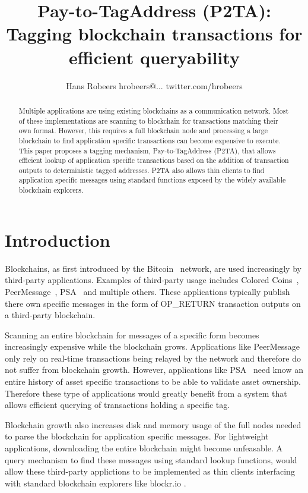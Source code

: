 \documentclass[a4paper,10pt]{article}
\title{Pay-to-TagAddress (P2TA): Tagging blockchain transactions for efficient queryability}
\author{Hans Robeers hrobeers@... twitter.com/hrobeers}
\begin{document}
\maketitle

\begin{abstract}
Multiple applications are using existing blockchains as a communication network.
Most of these implementations are scanning to blockchain for transactions matching their own format.
However, this requires a full blockchain node and processing a large blockchain to find application specific transactions can become expensive to execute.
This paper proposes a tagging mechanism, Pay-to-TagAddress (P2TA), that allows efficient lookup of application specific transactions based on the addition of transaction outputs to deterministic tagged addresses. P2TA also allows thin clients to find application specific messages using standard functions exposed by the widely available blockchain explorers.
\end{abstract}

\doclicenseThis

\section{Introduction}
Blockchains, as first introduced by the Bitcoin~\cite{Nak08} network, are used increasingly by third-party applications.
Examples of third-party usage includes Colored Coins~\cite{Ros12}, PeerMessage~\cite{Emeth}, PSA~\cite{Pchem} and multiple others.
These applications typically publish there own specific messages in the form of OP\_RETURN transaction outputs on a third-party blockchain.

Scanning an entire blockchain for messages of a specific form becomes increasingly expensive while the blockchain grows.
Applications like PeerMessage~\cite{Emeth} only rely on real-time transactions being relayed by the network and therefore do not suffer from blockchain growth.
However, applications like PSA~\cite{Pchem} need know an entire history of asset specific transactions to be able to validate asset ownership.
Therefore these type of applications would greatly benefit from a system that allows efficient querying of transactions holding a specific tag.

Blockchain growth also increases disk and memory usage of the full nodes needed to parse the blockchain for application specific messages. For lightweight applications, downloading the entire blockchain might become unfeasable. A query mechanism to find these messages using standard lookup functions, would allow these third-party applictions to be implemented as thin clients interfacing with standard blockchain explorers like blockr.io \cite{Blockr}.
\end{document}
